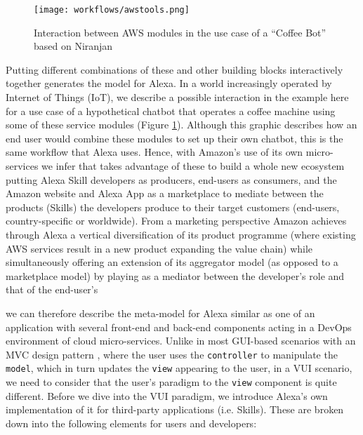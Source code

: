 \begin{figure}[h!]
	\caption[Interaction Between AWS Modules (Coffee Bot)]{Interaction between AWS modules in the use case of a ``Coffee Bot'' based on Niranjan \cite{aws:lex_webinar} }\label{lex_interactionExample}
	\centering
	\texttt{[image: workflows/awstools.png]}
\end{figure}
%




Putting different combinations of these and other building blocks interactively together generates the model for Alexa. In a world increasingly operated by Internet of Things (IoT), we describe a possible interaction in the example here for a use case of a hypothetical chatbot that operates a coffee machine using some of these service modules (Figure \ref{lex_interactionExample}).  Although this graphic describes how an end user would combine these modules to set up their own chatbot, this is the same workflow that Alexa uses. Hence, with Amazon's use of its own micro-services we infer that takes advantage of these to build a whole new ecosystem putting Alexa Skill developers as producers, end-users as consumers, and the Amazon website and Alexa App as a marketplace to mediate between the products (Skills) the developers produce to their target customers (end-users, country-specific or worldwide). From a marketing perspective Amazon achieves through Alexa a vertical diversification of its product programme (where existing AWS services result in a new product expanding the value chain) while simultaneously offering an extension of its aggregator model (as opposed to a marketplace model)%
 by playing as a mediator between the developer's role and that of the end-user's %




we can therefore describe the meta-model for Alexa similar as one %
of an application with several front-end and back-end components acting in a DevOps environment of cloud micro-services. Unlike in most GUI-based scenarios with an MVC design pattern \cite{wiki:mvc}, where the user uses the \texttt{controller} to manipulate the \texttt{model}, which in turn updates the \texttt{view} appearing to the user, in a VUI scenario, we need to consider that the user's paradigm to the \texttt{view} component is quite different. Before we dive into the VUI paradigm, we introduce Alexa's own implementation of it for third-party applications (i.e. Skills). These are broken down into the following elements for users and developers: %



